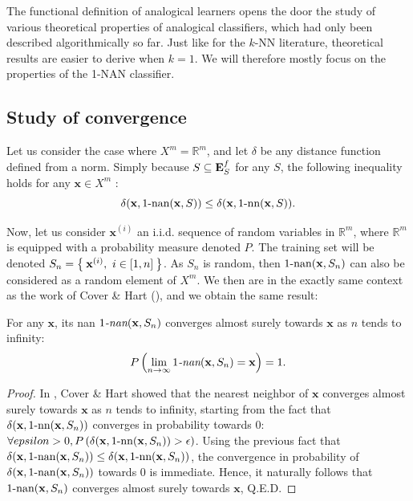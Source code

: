 The functional definition of analogical learners opens the door the study of
various theoretical properties of analogical classifiers, which had only been
described algorithmically so far. Just like for the $k$-NN literature,
theoretical results are easier to derive when $k = 1$. We will therefore mostly
focus on the properties of the 1-NAN classifier.
\subsection{Study of convergence}

Let us consider the case where $X^m=\mathbb{R}^m$, and let $\delta$ be any
distance function defined from a norm. Simply because $S \subseteq \mathbf{E}_{S}^{f}$ for
any $S$, the
following inequality holds for any $\mathbf{x} \in X^m$ :
$$\delta(\mathbf{x}, 1\text{-nan}(\mathbf{x},S)) \leq \delta(\mathbf{x},
1\mbox{-nn}(\mathbf{x},S)).$$


Now, let us consider  $\mathbf{x}^{(i)}$ an i.i.d. sequence of random variables
in $\mathbb{R}^m$, where $\mathbb{R}^m$ is equipped with a probability measure
denoted $P$. The training set will be denoted $S_n=\Set{\mathbf{x}^{(i)}, ~ i
\in [1, n]}$. As $S_n$ is random, then $1\text{-nan}(\mathbf{x},S_n)$ can also be
considered as a random element of $X^m$.  We then are in the exactly same
context as the work of Cover \& Hart (\cite{CovHarTIT67}), and we obtain the
same result:
\begin{property}
  \label{PROPER:convergence_nan}
  For any $\mathbf{x}$, its nan $1\emph{-nan}(\mathbf{x}, S_n)$ converges almost
  surely towards $\mathbf{x}$ as $n$ tends to infinity:
  $$P\left(\lim_{n \to \infty} 1\emph{-nan}(\mathbf{x}, S_n) = \mathbf{x}\right) =
  1.$$
\end{property}
\begin{proof}
  In \cite{CovHarTIT67}, Cover \& Hart showed that the nearest neighbor of
  $\mathbf{x}$ converges almost surely towards $\mathbf{x}$ as $n$ tends to
  infinity, starting from the fact that $\delta(\mathbf{x}, 1\mbox{-nn}(\mathbf{x},
  S_n))$ converges in probability towards $0$: $\forall epsilon > 0,
  P\left(\delta(\mathbf{x}, 1\mbox{-nn}(\mathbf{x}, S_n)) > \epsilon\right)$. Using the
  previous fact that $\delta(\mathbf{x}, 1\text{-nan}(\mathbf{x},S_n)) \leq
  \delta(\mathbf{x}, 1\mbox{-nn}(\mathbf{x},S_n))$, the convergence in probability of
  $\delta(\mathbf{x}, 1\text{-nan}(\mathbf{x},S_n))$ towards $0$ is immediate. Hence,
  it naturally follows that $1\text{-nan}(\mathbf{x}, S_n)$ converges almost surely
  towards $\mathbf{x}$, Q.E.D.
\end{proof}

